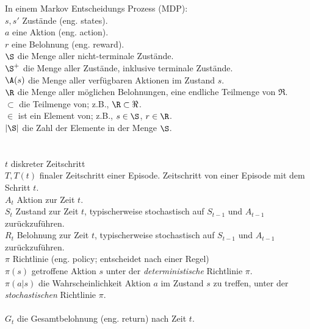 \documentclass[a4paper,titlepage]{article}
\numberwithin{equation}{section} %
\begin{document}
\>In einem Markov Entscheidungs Prozess (MDP):\\
\>$s, s'$             \> Zustände (eng. states).\\
\>$a$                 \> eine Aktion (eng. action).\\
\>$r$                 \> eine Belohnung (eng. reward).\\
\>$\S$                \> die Menge aller nicht-terminale Zustände. \\
\>$\S^+$              \> die Menge aller Zustände, inklusive terminale Zustände. \\
\>$\A(s)$             \> die Menge aller verfügbaren Aktionen im Zustand $s$.\\
\>$\R$                \> die Menge aller möglichen Belohnungen, eine endliche Teilmenge von $\Re$.\\
\>$\subset$           \> die Teilmenge von; z.B., $\R\subset\Re$.\\
\>$\in$               \> ist ein Element von; z.B., $s\in\S$, $r\in\R$.\\
\>$|\S|$              \> die Zahl der Elemente in der Menge $\S$.\\
\\
\\
\>$t$                 \> diskreter Zeitschritt\\
\>$T, T(t)$           \> finaler Zeitschritt einer Episode. Zeitschritt von einer Episode mit dem Schritt $t$.\\
\>$A_t$               \> Aktion zur Zeit $t$.\\
\>$S_t$               \> Zustand zur Zeit $t$, typischerweise stochastisch auf $S_{t-1}$ und $A_{t-1}$ zurückzuführen.\\
\>$R_t$               \> Belohnung zur Zeit $t$, typischerweise stochastisch auf $S_{t-1}$ und $A_{t-1}$ zurückzuführen.\\
\>$\pi$               \> Richtlinie (eng. policy; entscheidet nach einer Regel)\\
\>$\pi(s)$            \> getroffene Aktion $s$ unter der {\it deterministische\/} Richtlinie $\pi$.\\
\>$\pi(a|s)$          \> die Wahrscheinlichkeit Aktion $a$ im Zustand $s$ zu treffen, unter der {\it stochastischen\/} Richtlinie $\pi$.\\
\\
\>$G_t$               \> die Gesamtbelohnung (eng. return) nach Zeit $t$.\\
\end{document}
